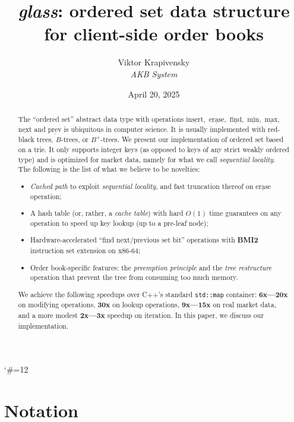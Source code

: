 \documentclass[a4paper,12pt]{article}
\title{\textit{glass}: ordered set data structure for client-side order books}
\author{Viktor Krapivensky\\ \textit{AKB System}}
\date{%
    April 20, 2025
}
\begin{document}
\begingroup\catcode`\#=12
\newcommand\MyHash{} %
\gdef\MyHash{#}
\endgroup

\newcommand\MyColor[1]{\MyHash#1}

\maketitle

\begin{abstract}
    The ``ordered set'' abstract data type with operations
    $\underline{\mathrm{insert}},$
    $\underline{\mathrm{erase}},$
    $\underline{\mathrm{find}},$
    $\underline{\mathrm{min}},$
    $\underline{\mathrm{max}},$
    $\underline{\mathrm{next}}$ and
    $\underline{\mathrm{prev}}$ is ubiquitous in computer science.
    It is usually implemented with red-black trees, $B$-trees, or $B^+$-trees.
    We present our implementation of ordered set based on a trie.
    It only supports integer keys (as opposed to keys of any strict weakly ordered type)
    and is optimized for market data, namely for what we call \textit{sequential locality}.
    The following is the list of what we believe to be novelties:
    \begin{itemize}
        \item \textit{Cached path} to exploit \textit{sequential locality}, and fast truncation thereof on $\underline{\textrm{erase}}$ operation;
        \item A hash table (or, rather, a \textit{cache table}) with hard $O(1)$ time guarantees on any operation to speed up key lookup (up to a pre-leaf node);
        \item Hardware-accelerated ``find next/previous set bit'' operations with \textbf{BMI2} instruction set extension on x86-64;
        \item Order book-specific features: the \textit{preemption principle} and the \textit{tree restructure} operation that prevent the tree from consuming too much memory.
    \end{itemize}
    We achieve the following speedups over C++'s standard \texttt{std::map} container:
    \textbf{6x---20x} on modifying operations,
    \textbf{30x} on lookup operations,
    \textbf{9x---15x} on real market data,
    and a more modest \textbf{2x---3x} speedup on iteration.
    In this paper, we discuss our implementation.
\end{abstract}

\section{Notation}
\end{document}
